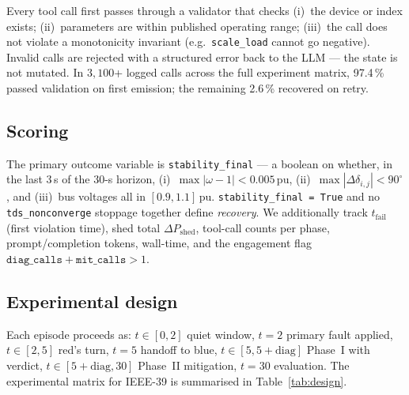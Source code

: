 \documentclass[journal,twocolumn,10pt]{IEEEtran}
\begin{document}
Every tool call first passes through a validator that checks (i)~the device or index exists; (ii)~parameters are within published operating range; (iii)~the call does not violate a monotonicity invariant (e.g.\ \texttt{scale\_load} cannot go negative). Invalid calls are rejected with a structured error back to the LLM --- the state is not mutated. In $3{,}100$+ logged calls across the full experiment matrix, 97.4\,\% passed validation on first emission; the remaining 2.6\,\% recovered on retry.

\subsection{Scoring}
The primary outcome variable is \texttt{stability\_final} --- a boolean on whether, in the last 3\,s of the 30-s horizon, (i)~$\max|\omega-1| < 0.005$\,pu, (ii)~$\max|\Delta\delta_{i,j}| < 90^{\circ}$, and (iii)~bus voltages all in $[0.9, 1.1]$\,pu. \texttt{stability\_final = True} and no \texttt{tds\_nonconverge} stoppage together define \emph{recovery}. We additionally track $t_\text{fail}$ (first violation time), shed total $\Delta P_\text{shed}$, tool-call counts per phase, prompt/completion tokens, wall-time, and the engagement flag $\texttt{diag\_calls} + \texttt{mit\_calls} > 1$.

\subsection{Experimental design}
\label{sec:design}
Each episode proceeds as: $t \in [0, 2]$ quiet window, $t = 2$ primary fault applied, $t \in [2, 5]$ red's turn, $t = 5$ handoff to blue, $t \in [5, 5+\text{diag}]$ Phase~I with verdict, $t \in [5+\text{diag}, 30]$ Phase~II mitigation, $t = 30$ evaluation. The experimental matrix for IEEE-39 is summarised in Table~\ref{tab:design}.
\end{document}
